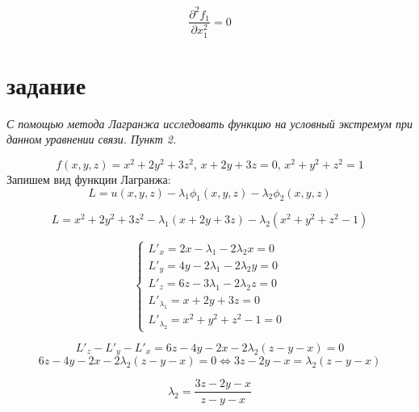 \documentclass[a5paper, 10pt]{article}
\theoremstyle{definition}
\theoremstyle{plain}
\theoremstyle{remark}
\begin{document}
\begin{equation}
\frac{\partial ^ 2 f_1}{\partial x_1^2} = 0
\end{equation}










\newpage

\section{задание}
\textit{С помощью метода Лагранжа исследовать функцию на условный экстремум при данном уравнении связи. Пункт 2.}

\begin{equation}
f(x, y, z) = x^2+2y^2+3z^2, \, x + 2y+3z=0, \, x^2 +y^2+z^2=1
\end{equation}
Запишем вид функции Лагранжа:
\begin{equation}
L = u(x, y, z) - \lambda_1 \phi_1 (x, y, z) - \lambda_2 \phi_2 (x, y, z)
\end{equation}

\begin{equation}
L = x^2+2y^2+3z^2  - \lambda_1 \left(  x + 2y+3z \right) - \lambda_2 \left( x^2 +y^2+z^2 - 1   \right)
\end{equation}

\begin{equation}
\begin{cases}
L'_x = 2x - \lambda_1 -2 \lambda_2 x = 0\\
L'_y = 4y  - 2\lambda_1  - 2\lambda_2 y = 0\\
L'_z = 6z  - 3 \lambda_1  - 2\lambda_2 z = 0\\
L'_{\lambda_1}=   x + 2y+3z = 0\\
L'_ { \lambda_2} =  x^2 +y^2+z^2 - 1 = 0
\end{cases}
\end{equation}

\begin{equation}
L'_z - L'_y - L'_x = 6z-4y-2x -2 \lambda_2 (z - y - x) = 0
\end{equation}
\begin{equation}
6z-4y-2x -2 \lambda_2 (z - y - x) = 0 \Leftrightarrow 3z-2y-x = \lambda_2 (z - y - x)
\end{equation}

\begin{equation}
\lambda_2  = \frac{ 3z-2y-x}{z - y - x}
\end{equation}
\end{document}
